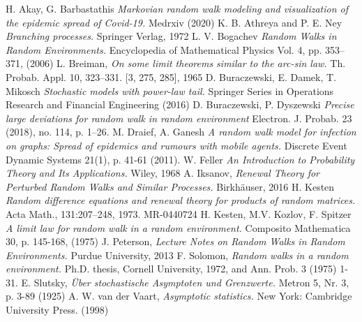 \documentclass[12pt]{article}
\newtheorem{fact}[theorem]{Fact}
\begin{document}

\newpage

\begin{thebibliography}{9}
	\itemsep2pt
	 H. Akay, G. Barbastathis \textit{Markovian random walk modeling and visualization of the epidemic spread of Covid-19.} Medrxiv (2020)
	 K. B. Athreya and P. E. Ney \textit{Branching processes.} Springer Verlag, 1972
	 L. V. Bogachev \textit{Random Walks in Random Environments.} Encyclopedia of Mathematical Physics Vol. 4, pp. 353–371, (2006)
	 L. Breiman, \textit{On some limit theorems similar to the arc-sin law.} Th. Probab. Appl. 10, 323–331. [3, 275, 285], 1965
	 D. Buraczewski, E. Damek, T. Mikosch \textit{Stochastic models with power-law tail.} Springer Series in Operations Research
and Financial Engineering (2016)
     D. Buraczewski, P. Dyszewski \textit{Precise large deviations for random walk in random environment} Electron. J. Probab. 23 (2018), no. 114, p. 1–26.
	 M. Draief, A. Ganesh \textit{A random walk model for infection on graphs: Spread of epidemics and rumours with mobile agents.} Discrete Event Dynamic Systems 21(1), p. 41-61 (2011).
	 W. Feller \textit{An Introduction to Probability Theory and Its Applications.} Wiley, 1968
	  A. Iksanov, \textit{Renewal Theory for Perturbed Random Walks and Similar Processes.} Birkhäuser, 2016
	 H. Kesten \textit{Random difference equations and renewal theory for products of random matrices.} Acta Math., 131:207–248, 1973. MR-0440724
	 H. Kesten, M.V. Kozlov, F. Spitzer \textit{A limit law for random walk in a random environment.} Composito Mathematica 30, p. 145-168, (1975)		
      J. Peterson, \textit{Lecture Notes on Random Walks in Random Environments.} Purdue University, 2013
     F. Solomon, \textit{Random walks in a random environment.} Ph.D. thesis, Cornell University, 1972, and Ann. Prob. 3 (1975) 1-31.
     E. Slutsky, \textit{Über stochastische Asymptoten und Grenzwerte.} Metron 5, Nr. 3, p. 3-89 (1925)
     A. W. van der Vaart, \textit{Asymptotic statistics.}  New York: Cambridge University Press. (1998)
\end{thebibliography}
\end{document}
